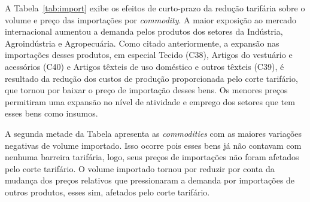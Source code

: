 

A Tabela~\ref{tab:import} exibe os efeitos de curto-prazo da redução tarifária sobre o volume e preço das importações por \textit{commodity}. A maior exposição ao mercado internacional aumentou a demanda pelos produtos dos setores da Indústria, Agroindústria e Agropecuária. Como citado anteriormente, a expansão nas importações desses produtos, em especial Tecido (C38), Artigos do vestuário e acessórios (C40) e Artigos têxteis de uso doméstico e outros têxteis (C39), é resultado da redução dos custos de produção proporcionada pelo corte tarifário, que tornou por baixar o preço de importação desses bens. Os menores preços permitiram uma expansão no nível de atividade e emprego dos setores que tem esses bens como insumos.

A segunda metade da Tabela apresenta as \textit{commodities} com as maiores variações negativas de volume importado. Isso ocorre pois esses bens já não contavam com nenhuma barreira tarifária, logo, seus preços de importações não foram afetados pelo corte tarifário. O volume importado tornou por reduzir por conta da mudança dos preços relativos que pressionaram a demanda por importações de outros produtos, esses sim, afetados pelo corte tarifário.


